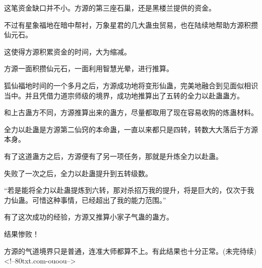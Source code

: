 \begin{this_body}
这笔资金缺口并不小。方源的第三座石巢，还是黑楼兰提供的资金。

不过有星象福地在暗中帮衬，万象星君的几大蛊虫贸易，也在陆续地帮助方源积攒仙元石。

这使得方源积累资金的时间，大为缩减。

方源一面积攒仙元石，一面利用智慧光晕，进行推算。

狐仙福地时间的一个多月之后，方源成功地将变形仙蛊，完美地融合到见面似相识当中。并且凭借力道宗师级的境界，成功地推算出了五转的全力以赴蛊蛊方。

和上古蛊方不同，方源推算出来的蛊方，尽量都取用了现在容易收购的炼蛊材料。

全力以赴蛊是方源第二仙窍的本命蛊，一直以来都只是四转，转数大大落后于方源本身。

有了这道蛊方之后，方源便有了另一项任务，那就是升炼全力以赴蛊。

失败了一次之后，全力以赴蛊提升到五转级数。

“若是能将全力以赴蛊提炼到六转，那对杀招万我的提升，将是巨大的，仅次于我力仙蛊。可惜这种事情，已经超出了我的能力范围。”

有了这次成功的经验，方源又推算小家子气蛊的蛊方。

结果惨败！

方源的气道境界只是普通，连准大师都算不上。有此结果也十分正常。(未完待续)<!--80txt.com-ouoou-->

\end{this_body}

